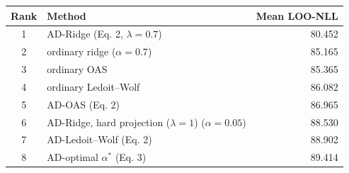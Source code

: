 \begin{tabular}{clr}
\toprule
Rank & Method & Mean LOO-NLL\\
\midrule
1 & AD-Ridge (Eq. 2, $\lambda=0.7$) & 80.452\\
2 & ordinary ridge ($\alpha=0.7$) & 85.165\\
3 & ordinary OAS & 85.365\\
4 & ordinary Ledoit--Wolf & 86.082\\
5 & AD-OAS (Eq. 2) & 86.965\\
6 & AD-Ridge, hard projection ($\lambda=1$) ($\alpha=0.05$) & 88.530\\
7 & AD-Ledoit--Wolf (Eq. 2) & 88.902\\
8 & AD-optimal $\alpha^\ast$ (Eq. 3) & 89.414\\
\bottomrule
\end{tabular}
